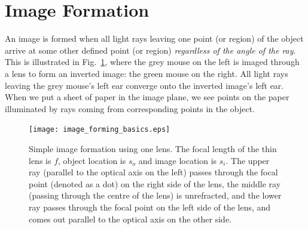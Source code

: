 \documentclass[a4paper]{report}
\begin{document}
%
%
%
%
{}
\addtocounter{exercises}{1}




\section{Image Formation}
An image is formed when all light rays leaving one point (or region) of the object arrive at some other defined point (or region) \textit{regardless of the angle of the ray}. 
This is illustrated in Fig.~\ref{fig:imageforming}, where the grey mouse on the left is imaged through a lens to form an inverted image: the green mouse on the right. 
All light rays leaving the grey mouse's left ear converge onto the inverted image's left ear. 
When we put a sheet of paper in the image plane, we see points on the paper illuminated by rays coming from corresponding points in the object. 



\begin{figure}[h]
\center
\texttt{[image: image\_forming\_basics.eps]}
\caption{Simple image formation using one lens. 
The focal length of the thin lens is $f$, object location is $s_o$ and image location is $s_i$. 
The upper ray (parallel to the optical axis on the left) passes through the focal point (denoted as a dot) on the right side of the lens, the middle ray (passing through the centre of the lens) is unrefracted, and the lower ray passes through the focal point on the left side of the lens, and comes out parallel to the optical axis on the other side. 
}
\label{fig:imageforming}
\end{figure}
\end{document}
